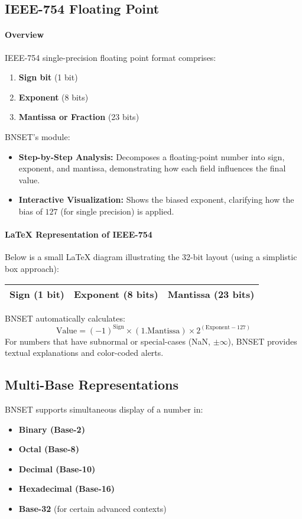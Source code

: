 \documentclass{article}
\begin{document}
\subsection{IEEE-754 Floating Point}
\label{sec:ieee754-floating-point}
\paragraph{Overview}
IEEE-754 single-precision floating point format comprises:
\begin{enumerate}
  \item \textbf{Sign bit} (1 bit)
  \item \textbf{Exponent} (8 bits)
  \item \textbf{Mantissa or Fraction} (23 bits)
\end{enumerate}

BNSET’s module:
\begin{itemize}
  \item \textbf{Step-by-Step Analysis:} Decomposes a floating-point number into sign, exponent, and mantissa, demonstrating how each field influences the final value.
  \item \textbf{Interactive Visualization:} Shows the biased exponent, clarifying how the bias of $127$ (for single precision) is applied.
\end{itemize}

\paragraph{LaTeX Representation of IEEE-754}
Below is a small \LaTeX{} diagram illustrating the 32-bit layout (using a simplistic box approach):

\begin{center}
\setlength{\fboxsep}{1.5pt}
\begin{tabular}{|c|c|c|}
\hline
Sign (1 bit) & Exponent (8 bits) & Mantissa (23 bits) \\
\hline
\end{tabular}
\end{center}

\noindent BNSET automatically calculates:
\[
\text{Value} = (-1)^{\text{Sign}} \times (1.\text{Mantissa}) \times 2^{(\text{Exponent}-127)}
\]
For numbers that have subnormal or special-cases (NaN, $\pm \infty$), BNSET provides textual explanations and color-coded alerts.

\subsection{Multi-Base Representations}
\label{sec:multi-base-representation}
BNSET supports simultaneous display of a number in:
\begin{itemize}
  \item \textbf{Binary (Base-2)}
  \item \textbf{Octal (Base-8)}
  \item \textbf{Decimal (Base-10)}
  \item \textbf{Hexadecimal (Base-16)}
  \item \textbf{Base-32} (for certain advanced contexts)
\end{itemize}
\end{document}
